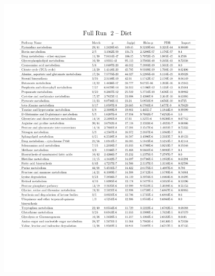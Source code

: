 \documentclass[a4paper]{book}
\begin{document}
\begin{subappendices}
\begin{figure}
	\centering
	\includegraphics[width=\linewidth]{3.Metabolomics/MSEA_charts_4.pdf}
\end{figure}


\end{subappendices}

	
\end{document}
